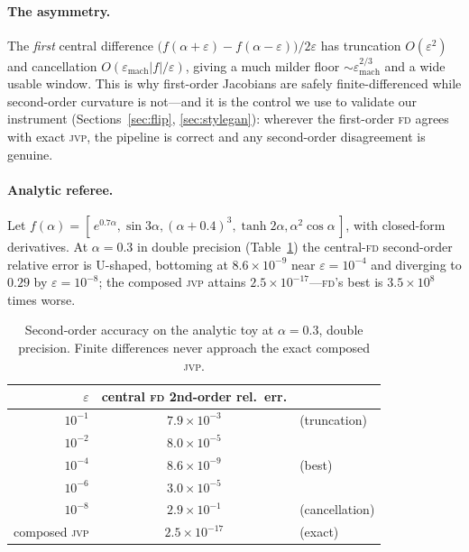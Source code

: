 \documentclass[11pt]{article}
\newcommand{\jvp}{\textsc{jvp}}
\newcommand{\fd}{\textsc{fd}}
\newcommand{\eps}{\varepsilon}
\begin{document}
\paragraph{The asymmetry.} The \emph{first} central difference
$\big(f(\alpha+\eps)-f(\alpha-\eps)\big)/2\eps$ has truncation $O(\eps^2)$ and
cancellation $O(\eps_{\mathrm{mach}}|f|/\eps)$, giving a much milder floor
$\sim\eps_{\mathrm{mach}}^{2/3}$ and a wide usable window. This is why first-order
Jacobians are safely finite-differenced while second-order curvature is not---and
it is the control we use to validate our instrument (Sections~\ref{sec:flip},
\ref{sec:stylegan}): wherever the first-order \fd{} agrees with exact \jvp, the
pipeline is correct and any second-order disagreement is genuine.

\paragraph{Analytic referee.} Let
$f(\alpha)=[\,e^{0.7\alpha},\sin 3\alpha,(\alpha+0.4)^3,\tanh 2\alpha,
\alpha^2\cos\alpha\,]$, with closed-form derivatives. At $\alpha=0.3$ in double
precision (Table~\ref{tab:toy}) the central-\fd{} second-order relative error is
U-shaped, bottoming at $8.6\times10^{-9}$ near $\eps=10^{-4}$ and diverging to
$0.29$ by $\eps=10^{-8}$; the composed \jvp{} attains $2.5\times10^{-17}$---\fd's
best is $3.5\times10^{8}$ times worse.

\begin{table}[h]\centering
\begin{tabular}{rcl}
\toprule
$\eps$ & central \fd{} 2nd-order rel.\ err. & \\
\midrule
$10^{-1}$ & $7.9\times10^{-3}$ & (truncation) \\
$10^{-2}$ & $8.0\times10^{-5}$ & \\
$10^{-4}$ & $8.6\times10^{-9}$ & (best) \\
$10^{-6}$ & $3.0\times10^{-5}$ & \\
$10^{-8}$ & $2.9\times10^{-1}$ & (cancellation) \\
\midrule
composed \jvp & $2.5\times10^{-17}$ & (exact) \\
\bottomrule
\end{tabular}
\caption{Second-order accuracy on the analytic toy at $\alpha=0.3$, double
precision. Finite differences never approach the exact composed \jvp.}
\label{tab:toy}
\end{table}
\end{document}
